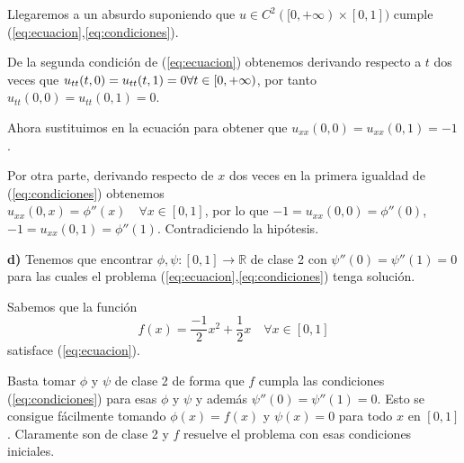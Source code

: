 \documentclass[a4]{article}
\begin{document}
Llegaremos a un absurdo suponiendo que
$u\in C^2([0,+\infty)\times[0,1])$ cumple
(\ref{eq:ecuacion},\ref{eq:condiciones}).

De la segunda condición de (\ref{eq:ecuacion}) obtenemos derivando
respecto a $t$ dos veces que
$u_{tt}(t,0)=u_{tt}(t,1)=0\\ \forall t\in [0,+\infty)$, por tanto
$u_{tt}(0,0)=u_{tt}(0,1)=0$.

Ahora sustituimos en la ecuación para obtener que
$u_{xx}(0,0)=u_{xx}(0,1)=-1$.

Por otra parte, derivando respecto de $x$ dos veces en la primera
igualdad de (\ref{eq:condiciones}) obtenemos \\
$u_{xx}(0,x)=\phi''(x)\quad\forall x \in [0,1]$, por lo que
$-1=u_{xx}(0,0)=\phi''(0)$, $-1=u_{xx}(0,1)=\phi''(1)$. Contradiciendo
la hipótesis.

\vspace{4mm}

\textbf{d)} Tenemos que encontrar
$\phi,\psi:[0,1]\rightarrow\mathbb{R}$ de clase 2 con
$\psi''(0)=\psi''(1)=0$ para las cuales el problema
(\ref{eq:ecuacion},\ref{eq:condiciones}) tenga solución.

Sabemos que la función
\[f(x)=\frac{-1}{2}x^2+\frac{1}{2}x\quad\forall x\in[0,1]\]
satisface (\ref{eq:ecuacion}).

Basta tomar $\phi$ y $\psi$ de clase 2 de forma que $f$ cumpla las
condiciones (\ref{eq:condiciones}) para esas $\phi$ y $\psi$ y además
$\psi''(0)=\psi''(1)=0$. Esto se consigue fácilmente tomando
$\phi(x)=f(x)$ y $\psi(x)=0$ para todo $x$ en $[0,1]$. Claramente son
de clase 2 y $f$ resuelve el problema con esas condiciones iniciales.
\end{document}
